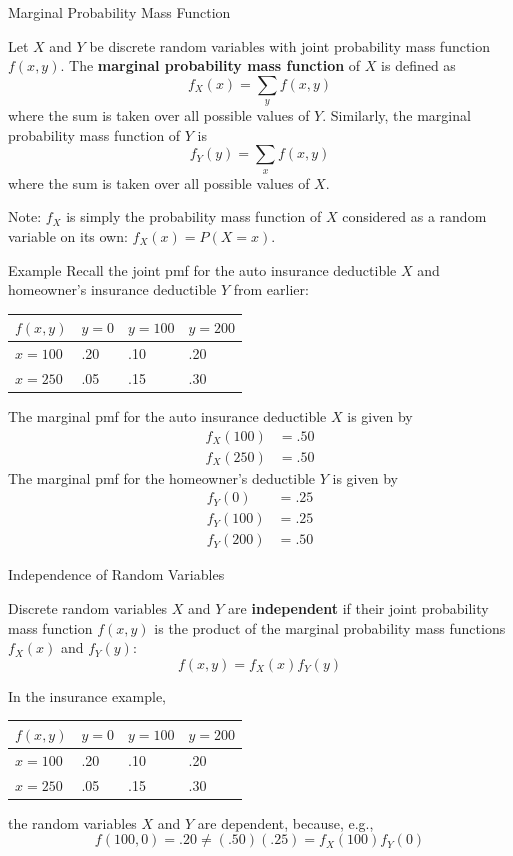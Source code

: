 \documentclass[handout]{beamer}
\renewcommand{\emph}{\textbf}
\begin{document}
\begin{frame}{Marginal Probability Mass Function}
\begin{block}{}
Let $X$ and $Y$ be discrete random variables with joint probability mass function $f(x,y)$. The \emph{marginal probability mass function} of $X$ is defined as
$$f_X(x) = \sum_y f(x,y)$$
where the sum is taken over all possible values of $Y$. Similarly, the marginal probability mass function of $Y$ is
$$f_Y(y) = \sum_x f(x,y)$$
where the sum is taken over all possible values of $X$.
\end{block}

Note: $f_X$ is simply the probability mass function of $X$ considered as a random variable on its own: $f_X(x) = P(X=x)$.
\end{frame}

\begin{frame}{Example}
Recall the joint pmf for the auto insurance deductible $X$ and homeowner's insurance deductible $Y$ from earlier:
\begin{center}
\begin{tabular}{l||l|l|l}
$f(x,y)$ & $y=0$ & $y=100$ & $y=200$ \\ \hline \hline
$x=100$ & .20 & .10 & .20 \\ \hline
$x=250$ & .05 & .15 & .30
\end{tabular}
\end{center}
\pause The marginal pmf for the auto insurance deductible $X$ is given by
\begin{align*}
f_X(100) &= .50 \\
f_X(250) &= .50
\end{align*}
\pause The marginal pmf for the homeowner's deductible $Y$ is given by
\begin{align*}
f_Y(0) &= .25 \\
f_Y(100) &= .25 \\
f_Y(200) &= .50
\end{align*}
\end{frame}

\begin{frame}{Independence of Random Variables}
\begin{block}{}
Discrete random variables $X$ and $Y$ are \emph{independent} if their joint probability mass function $f(x,y)$ is the product of the marginal probability mass functions $f_X(x)$ and $f_Y(y)$:
$$f(x,y) = f_X(x)f_Y(y)$$
\end{block}

In the insurance example,
\begin{center}
\begin{tabular}{l||l|l|l}
$f(x,y)$ & $y=0$ & $y=100$ & $y=200$ \\ \hline \hline
$x=100$ & .20 & .10 & .20 \\ \hline
$x=250$ & .05 & .15 & .30
\end{tabular}
\end{center}
the random variables $X$ and $Y$ are dependent, because, e.g.,
$$f(100,0) = .20 \neq (.50)(.25) = f_X(100)f_Y(0)$$
\end{frame}
\end{document}
